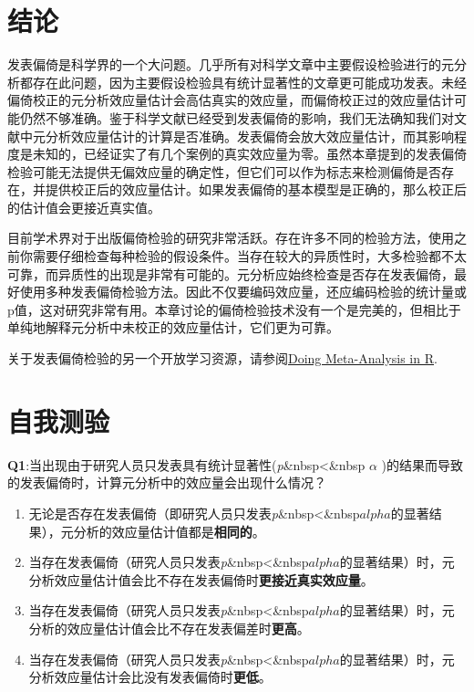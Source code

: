 \documentclass[
  letterpaper,
  DIV=11,
  numbers=noendperiod]{scrreprt}
\providecommand{\tightlist}{%
  \setlength{\itemsep}{0pt}\setlength{\parskip}{0pt}}\usepackage{longtable,booktabs,array}
\begin{document}
\hypertarget{ux7ed3ux8bba}{%
\section{结论}\label{ux7ed3ux8bba}}

发表偏倚是科学界的一个大问题。几乎所有对科学文章中主要假设检验进行的元分析都存在此问题，因为主要假设检验具有统计显著性的文章更可能成功发表。未经偏倚校正的元分析效应量估计会高估真实的效应量，而偏倚校正过的效应量估计可能仍然不够准确。鉴于科学文献已经受到发表偏倚的影响，我们无法确知我们对文献中元分析效应量估计的计算是否准确。发表偏倚会放大效应量估计，而其影响程度是未知的，已经证实了有几个案例的真实效应量为零。虽然本章提到的发表偏倚检验可能无法提供无偏效应量的确定性，但它们可以作为标志来检测偏倚是否存在，并提供校正后的效应量估计。如果发表偏倚的基本模型是正确的，那么校正后的估计值会更接近真实值。

目前学术界对于出版偏倚检验的研究非常活跃。存在许多不同的检验方法，使用之前你需要仔细检查每种检验的假设条件。当存在较大的异质性时，大多检验都不太可靠，而异质性的出现是非常有可能的。元分析应始终检查是否存在发表偏倚，最好使用多种发表偏倚检验方法。因此不仅要编码效应量，还应编码检验的统计量或p值，这对研究非常有用。本章讨论的偏倚检验技术没有一个是完美的，但相比于单纯地解释元分析中未校正的效应量估计，它们更为可靠。

关于发表偏倚检验的另一个开放学习资源，请参阅\href{https://bookdown.org/MathiasHarrer/Doing_Meta_Analysis_in_R/pub-bias.html}{Doing
Meta-Analysis in R}.

\hypertarget{ux81eaux6211ux6d4bux9a8c-1}{%
\section{自我测验}\label{ux81eaux6211ux6d4bux9a8c-1}}

\textbf{Q1}:当出现由于研究人员只发表具有统计显著性(\emph{p}\&nbsp\textless\&nbsp
\(\alpha\)
)的结果而导致的发表偏倚时，计算元分析中的效应量会出现什么情况？

\begin{enumerate}
\def\labelenumi{\Alph{enumi})}
\tightlist
\item
  无论是否存在发表偏倚（即研究人员只发表\emph{p}\&nbsp\textless\&nbsp\(alpha\)的显著结果），元分析的效应量估计值都是\textbf{相同的}。
\item
  当存在发表偏倚（研究人员只发表\emph{p}\&nbsp\textless\&nbsp\(alpha\)的显著结果）时，元分析效应量估计值会比不存在发表偏倚时\textbf{更接近真实效应量}。
\item
  当存在发表偏倚（研究人员只发表\emph{p}\&nbsp\textless\&nbsp\(alpha\)的显著结果）时，元分析的效应量估计值会比不存在发表偏差时\textbf{更高}。
\item
  当存在发表偏倚（研究人员只发表\emph{p}\&nbsp\textless\&nbsp\(alpha\)的显著结果）时，元分析效应量估计会比没有发表偏倚时\textbf{更低}。
\end{enumerate}
\end{document}
